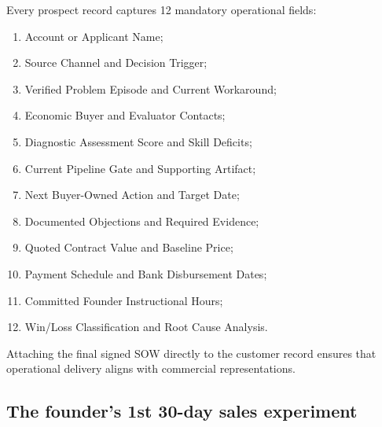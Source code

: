 Every prospect record captures 12 mandatory operational fields:
\begin{enumerate}
\item Account or Applicant Name;
\item Source Channel and Decision Trigger;
\item Verified Problem Episode and Current Workaround;
\item Economic Buyer and Evaluator Contacts;
\item Diagnostic Assessment Score and Skill Deficits;
\item Current Pipeline Gate and Supporting Artifact;
\item Next Buyer-Owned Action and Target Date;
\item Documented Objections and Required Evidence;
\item Quoted Contract Value and Baseline Price;
\item Payment Schedule and Bank Disbursement Dates;
\item Committed Founder Instructional Hours;
\item Win/Loss Classification and Root Cause Analysis.
\end{enumerate}
Attaching the final signed SOW directly to the customer record ensures that operational delivery aligns with commercial representations.

\subsection{The founder's 1st 30-day sales experiment}

